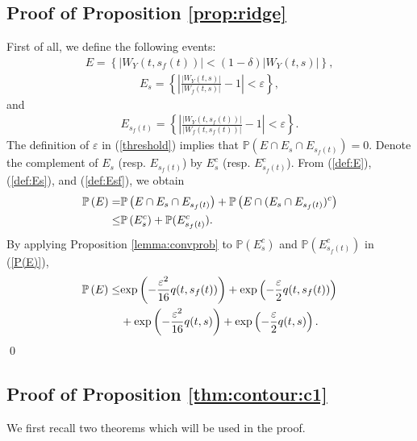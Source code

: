 \documentclass{amsart}
\begin{document}
\subsection{Proof of Proposition \ref{prop:ridge}}\label{sec:proof:prop:ridge}


First of all, we define the following events:
\begin{align}\label{def:E}
E=\left\{|W_{Y}(t,s_{f}(t))|<(1-\delta) |W_{Y}(t,s)|\right\},
\end{align}
\begin{align}\label{def:Es}
E_{s}=\left\{\left|\frac{|W_{Y}(t,s)|}{|W_{f}(t,s)|}-1\right|<\varepsilon\right\},
\end{align}
and
\begin{align}\label{def:Esf}
E_{s_{f}(t)}=\left\{\left|\frac{|W_{Y}(t,s_{f}(t))|}{|W_{f}(t,s_{f}(t))|}-1\right|<\varepsilon\right\}.
\end{align}
The definition of $\varepsilon$ in (\ref{threshold}) implies that $\mathbb{P}\left(E\cap E_{s}\cap E_{s_{f}(t)}\right)=0$.
Denote the complement of $E_{s}$ (resp. $E_{s_{f}(t)}$) by  $E_{s}^{c}$ (resp. $E^{c}_{s_{f}(t)}$).
From (\ref{def:E}), (\ref{def:Es}), and (\ref{def:Esf}), we obtain
\begin{align}\notag
\mathbb{P}\left(E\right)
=& \mathbb{P}\left(E\cap E_{s}\cap E_{s_{f}(t)}\right)+\mathbb{P}\left(E\cap (E_{s}\cap E_{s_{f}(t)})^{c}\right)
\\\label{P(E)}\leq&\mathbb{P}\left(E_{s}^{c}\right)
+\mathbb{P}(E_{s_{f}(t)}^{c}).
\end{align}
By applying Proposition \ref{lemma:convprob} to $\mathbb{P}(E_{s}^{c})$
and $\mathbb{P}(E_{s_{f}(t)}^{c})$
in (\ref{P(E)}),
\begin{align}\notag
\mathbb{P}\left(E\right)\leq&
\textup{exp}\left(-\frac{\varepsilon^{2}}{16}q(t,s_{f}(t))\right)
+\textup{exp}\left(-\frac{\varepsilon}{2}q(t,s_{f}(t))\right)
\\\notag&+\textup{exp}\left(-\frac{\varepsilon^{2}}{16}q(t,s)\right)
+\textup{exp}\left(-\frac{\varepsilon}{2}q(t,s)\right).
\end{align}
\qed






\subsection{Proof of Proposition \ref{thm:contour:c1}}\label{sec:proof:thm:contour:c1}
We first recall two theorems which will be used in the proof.
\end{document}
